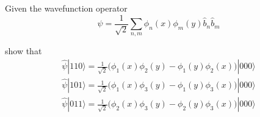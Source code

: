 \documentclass[12pt]{article}
\begin{document}
\noindent
Given the wavefunction operator
\begin{equation*}
\hat{\psi}=\frac{1}{\sqrt{2}}\sum_{n,m}\phi_n(x)\phi_m(y)\hat{b}_n\hat{b}_m
\end{equation*}

\noindent
show that
\begin{align*}
\hat{\psi}|110\rangle=\frac{1}{\sqrt{2}}\big(\phi_1(x)\phi_2(y)-\phi_1(y)\phi_2(x)\big)|000\rangle
\\[2ex]
\hat{\psi}|101\rangle=\frac{1}{\sqrt{2}}\big(\phi_1(x)\phi_3(y)-\phi_1(y)\phi_3(x)\big)|000\rangle
\\[2ex]
\hat{\psi}|011\rangle=\frac{1}{\sqrt{2}}\big(\phi_2(x)\phi_3(y)-\phi_2(y)\phi_3(x)\big)|000\rangle
\end{align*}
\end{document}
